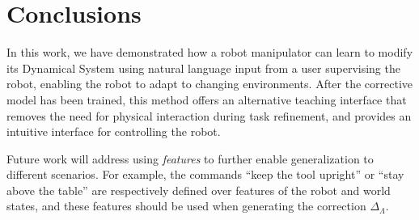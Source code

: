 \section{Conclusions}
\label{secConclusions}


In this work, we have demonstrated how a robot manipulator can learn to modify its Dynamical System using natural language input from a user supervising the robot, enabling the robot to adapt to changing environments.
After the corrective model has been trained, this method offers an alternative teaching interface
that removes the need for physical interaction during task refinement, and provides an intuitive interface for controlling the robot.

Future work will address using \emph{features} to further enable generalization to different scenarios.
For example, the commands ``keep the tool upright'' or ``stay above the table'' are respectively defined over features of the robot and world states, and these features should be used when generating the correction $\Delta_\Lambda$.

